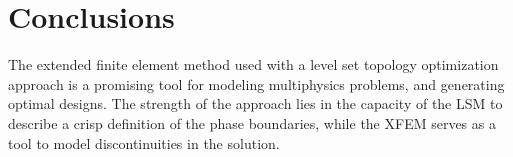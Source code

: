 \documentclass[12pt,letterpaper]{report}
\begin{document}















\chapter{Conclusions}
\label{sec:main_conclusions}
The extended finite element method used with a level set topology optimization approach is a promising tool for modeling multiphysics problems, and generating optimal designs. The strength of the approach lies in the capacity of the LSM to describe a crisp definition of the phase boundaries, while the XFEM serves as a tool to model discontinuities in the solution.
\end{document}
